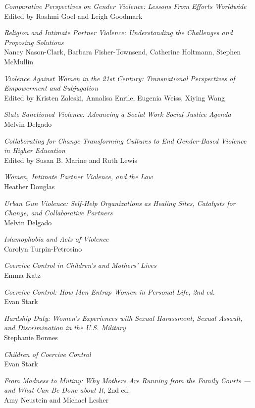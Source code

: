 \documentclass[11pt, twocolumn]{article}
\begin{document}
{\textit{Comparative Perspectives on Gender
Violence: Lessons From Efforts Worldwide}\\
Edited by Rashmi Goel and Leigh
Goodmark

\textit{Religion and Intimate Partner Violence:
Understanding the Challenges and
Proposing Solutions}\\
Nancy Nason-Clark, Barbara
Fisher-Townsend, Catherine Holtmann,
Stephen McMullin\\
\vspace*{1em}

\pagebreak

\vspace*{9em}


\textit{Violence Against Women in the 21st
Century: Transnational Perspectives of
Empowerment and Subjugation}\\
Edited by Kristen Zaleski, Annalisa Enrile,
Eugenia Weiss, Xiying Wang

\textit{State Sanctioned Violence: Advancing a
Social Work Social Justice Agenda}\\
Melvin Delgado

\textit{Collaborating for Change
Transforming Cultures to End
Gender-Based Violence in Higher
Education}\\
Edited by Susan B. Marine and Ruth Lewis

\textit{Women, Intimate Partner Violence, and the Law}\\
Heather Douglas

\textit{Urban Gun Violence: Self-Help
Organizations as Healing Sites, Catalysts
for Change, and Collaborative Partners}\\
Melvin Delgado

\textit{Islamophobia and Acts of Violence}\\
Carolyn Turpin-Petrosino

\textit{Coercive Control in Children's and
Mothers' Lives}\\
Emma Katz

\textit{Coercive Control: How Men Entrap Women
in Personal Life, 2nd ed.}\\
Evan Stark

\textit{Hardship Duty: Women’s Experiences with
Sexual Harassment, Sexual Assault, and
Discrimination in the U.S. Military}\\
Stephanie Bonnes

\textit{Children of Coercive Control}\\
Evan Stark

\textit{From Madness to Mutiny: Why Mothers
Are Running from the Family Courts --- and
What Can Be Done about It}, 2nd ed.\\
Amy Neustein and Michael Lesher


}
\end{document}
